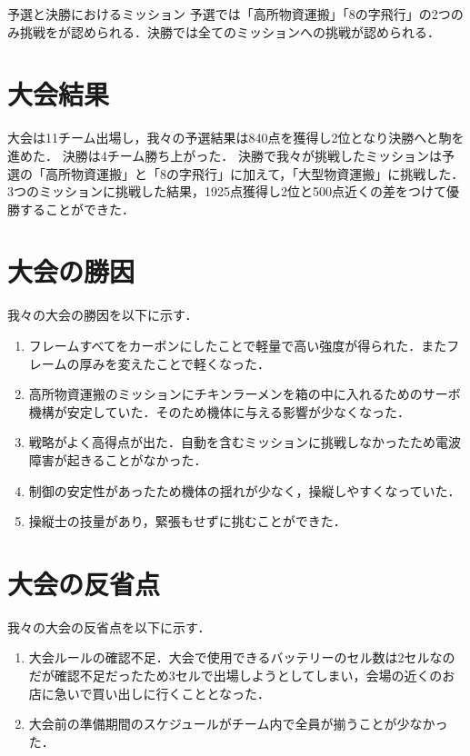予選と決勝におけるミッション
予選では「高所物資運搬」「8の字飛行」の2つのみ挑戦をが認められる．決勝では全てのミッションへの挑戦が認められる．

\section{大会結果}
大会は11チーム出場し，我々の予選結果は840点を獲得し2位となり決勝へと駒を進めた．
決勝は4チーム勝ち上がった．
決勝で我々が挑戦したミッションは予選の「高所物資運搬」と「8の字飛行」に加えて，「大型物資運搬」に挑戦した．
3つのミッションに挑戦した結果，1925点獲得し2位と500点近くの差をつけて優勝することができた．

\section{大会の勝因}

我々の大会の勝因を以下に示す．
\begin{enumerate}
  \item フレームすべてをカーボンにしたことで軽量で高い強度が得られた．またフレームの厚みを変えたことで軽くなった．
  \item 高所物資運搬のミッションにチキンラーメンを箱の中に入れるためのサーボ機構が安定していた．そのため機体に与える影響が少なくなった．
  \item 戦略がよく高得点が出た．自動を含むミッションに挑戦しなかったため電波障害が起きることがなかった．
  \item 制御の安定性があったため機体の揺れが少なく，操縦しやすくなっていた． 
  \item 操縦士の技量があり，緊張もせずに挑むことができた．
\end{enumerate}

\section{大会の反省点}

我々の大会の反省点を以下に示す．
\begin{enumerate}
  \item 大会ルールの確認不足．大会で使用できるバッテリーのセル数は2セルなのだが確認不足だったため3セルで出場しようとしてしまい，会場の近くのお店に急いで買い出しに行くこととなった．
  \item 大会前の準備期間のスケジュールがチーム内で全員が揃うことが少なかった．
\end{enumerate}






